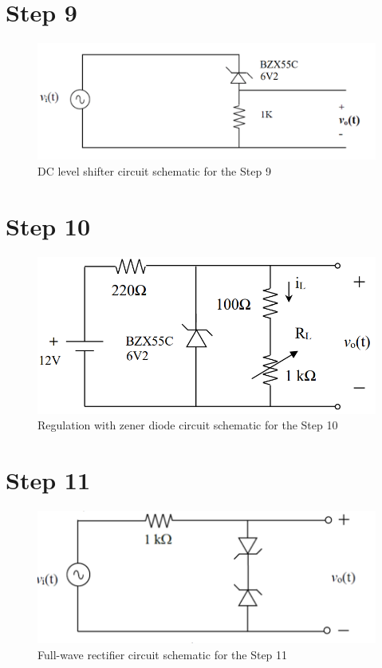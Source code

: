 \documentclass[letterpaper,12pt]{article}
\begin{document}
\section{Step 9}
\begin{figure}[H]
    \centering
   \includegraphics[width=1\textwidth]{9_1.png}
   \caption{DC level shifter circuit schematic for the Step 9}
\end{figure} 

\section{Step 10}
\begin{figure}[H]
    \centering
   \includegraphics[width=1\textwidth]{10_1.png}
   \caption{Regulation with zener diode circuit schematic for the Step 10}
\end{figure} 

\section{Step 11}
\begin{figure}[H]
    \centering
   \includegraphics[width=1\textwidth]{11_1.png}
   \caption{Full-wave rectifier circuit schematic for the Step 11}
\end{figure} 
\end{document}
